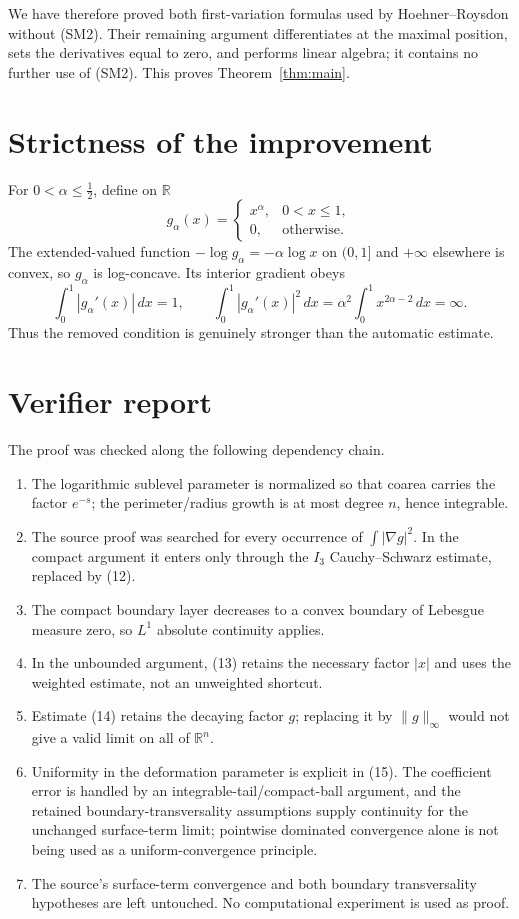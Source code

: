 \documentclass[11pt]{article}
\newcommand{\R}{\mathbb R}
\begin{document}
We have therefore proved both first-variation formulas used by
Hoehner--Roysdon without \textup{(SM2)}.  Their remaining argument differentiates
at the maximal position, sets the derivatives equal to zero, and performs
linear algebra; it contains no further use of \textup{(SM2)}.  This proves
Theorem~\ref{thm:main}.

\section{Strictness of the improvement}
For $0<\alpha\le\tfrac12$, define on $\R$
\[
 g_\alpha(x)=
 \begin{cases}x^\alpha,&0<x\le1,\\0,&\text{otherwise}.
 \end{cases}
\]
The extended-valued function $-\log g_\alpha=-\alpha\log x$ on $(0,1]$ and
$+\infty$ elsewhere is convex, so $g_\alpha$ is log-concave.  Its interior
gradient obeys
\[
 \int_0^1|g_\alpha'(x)|\,dx=1,
 \qquad
 \int_0^1|g_\alpha'(x)|^2\,dx
 =\alpha^2\int_0^1x^{2\alpha-2}\,dx=\infty.
\]
Thus the removed condition is genuinely stronger than the automatic estimate.

\section{Verifier report}
The proof was checked along the following dependency chain.
\begin{enumerate}
\item The logarithmic sublevel parameter is normalized so that coarea carries
the factor $e^{-s}$; the perimeter/radius growth is at most degree $n$, hence
integrable.
\item The source proof was searched for every occurrence of
$\int|\nabla g|^2$.  In the compact argument it enters only through the
$I_3$ Cauchy--Schwarz estimate, replaced by (12).
\item The compact boundary layer decreases to a convex boundary of Lebesgue
measure zero, so $L^1$ absolute continuity applies.
\item In the unbounded argument, (13) retains the necessary factor $|x|$ and
uses the weighted estimate, not an unweighted shortcut.
\item Estimate (14) retains the decaying factor $g$; replacing it by
$\|g\|_\infty$ would not give a valid limit on all of $\R^n$.
\item Uniformity in the deformation parameter is explicit in (15).  The
coefficient error is handled by an integrable-tail/compact-ball argument, and
the retained boundary-transversality assumptions supply continuity for the
unchanged surface-term limit; pointwise dominated convergence alone is not
being used as a uniform-convergence principle.
\item The source's surface-term convergence and both boundary transversality
hypotheses are left untouched.  No computational experiment is used as proof.
\end{enumerate}
\end{document}
